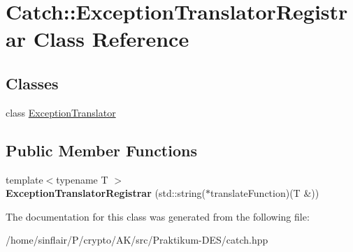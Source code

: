 \hypertarget{classCatch_1_1ExceptionTranslatorRegistrar}{}\section{Catch\+:\+:Exception\+Translator\+Registrar Class Reference}
\label{classCatch_1_1ExceptionTranslatorRegistrar}
\subsection*{Classes}
\begin{DoxyCompactItemize}
\item 
class \hyperlink{classCatch_1_1ExceptionTranslatorRegistrar_1_1ExceptionTranslator}{Exception\+Translator}
\end{DoxyCompactItemize}
\subsection*{Public Member Functions}
\begin{DoxyCompactItemize}
\item 
\mbox{\label{classCatch_1_1ExceptionTranslatorRegistrar_aa73229de911f26b1df6c6c87c4d9e04e}} 
{\footnotesize template$<$typename T $>$ }\\{\bfseries Exception\+Translator\+Registrar} (std\+::string($\ast$translate\+Function)(T \&))
\end{DoxyCompactItemize}


The documentation for this class was generated from the following file\+:\begin{DoxyCompactItemize}
\item 
/home/sinflair/\+P/crypto/\+A\+K/src/\+Praktikum-\/\+D\+E\+S/catch.\+hpp\end{DoxyCompactItemize}
